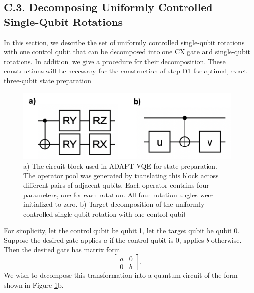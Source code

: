 \subsection*{C.3. Decomposing Uniformly Controlled Single-Qubit Rotations}
In this section, we describe the set of uniformly controlled single-qubit rotations 
with one control qubit that can be decomposed into one CX gate and single-qubit 
rotations. In addition, we give a procedure for their decomposition. These 
constructions will be necessary for the construction of step D1 for optimal, exact 
three-qubit state preparation.

\begin{figure}[h]
\centering
\includegraphics[width=0.6\linewidth]{main/figs/sfig_2.png}
\caption{a) The circuit block used in ADAPT-VQE for state preparation. The operator
pool was generated by translating this block across different pairs of 
adjacent qubits. Each operator contains four parameters, one for each rotation.
All four rotation angles were initialized to zero. b) Target decomposition of the uniformly controlled single-qubit rotation with one control qubit}
\label{sfig2}
\end{figure}

For simplicity, let the control qubit be qubit 1, let the target qubit be qubit 0. 
Suppose the desired gate applies $a$ if the control qubit is 0, applies $b$ 
otherwise. Then the desired gate has matrix form 
\begin{equation}
\begin{bmatrix}a&0\\0&b\end{bmatrix}.
\end{equation}
We wish to decompose this transformation into a quantum circuit of the form shown in
Figure \ref{sfig2}b.




